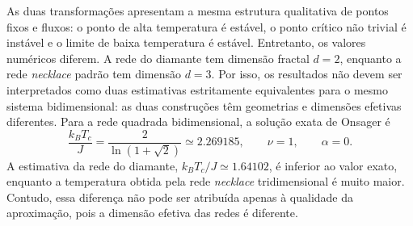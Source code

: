 \documentclass[12pt,a4paper]{article}
\begin{document}
%
As duas transformações apresentam a mesma estrutura qualitativa
de pontos fixos e fluxos: o ponto de alta temperatura é estável,
o ponto crítico não trivial é instável e o limite de baixa
temperatura é estável. Entretanto, os valores numéricos diferem. A rede do diamante tem dimensão fractal $d=2$, enquanto a rede \textit{necklace} padrão tem dimensão $d=3$. Por isso, os resultados não devem ser interpretados como duas estimativas estritamente equivalentes para o mesmo sistema bidimensional: as duas construções têm geometrias e dimensões efetivas diferentes. Para a rede quadrada bidimensional, a solução exata de Onsager é
%
\begin{equation}
    \frac{k_BT_c}{J}
    =
    \frac{2}{\ln(1+\sqrt2)}
    \simeq2.269185,
    \qquad
    \nu=1,
    \qquad
    \alpha=0.
\end{equation}
%
A estimativa da rede do diamante,
$k_BT_c/J\simeq1.64102$, é inferior ao valor exato, enquanto a
temperatura obtida pela rede \textit{necklace} tridimensional é
muito maior. Contudo, essa diferença não pode ser atribuída
apenas à qualidade da aproximação, pois a dimensão efetiva das
redes é diferente.
\end{document}
